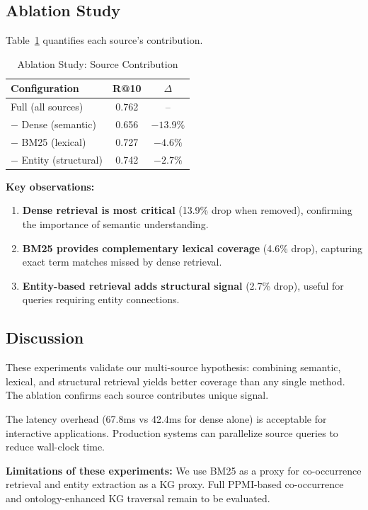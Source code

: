 \documentclass[11pt,a4paper]{article}
\begin{document}
\subsection{Ablation Study}

Table~\ref{tab:ablation} quantifies each source's contribution.

\begin{table}[h]
\centering
\caption{Ablation Study: Source Contribution}
\label{tab:ablation}
\begin{tabular}{lcc}
\toprule
\textbf{Configuration} & \textbf{R@10} & \textbf{$\Delta$} \\
\midrule
Full (all sources) & 0.762 & -- \\
$-$ Dense (semantic) & 0.656 & $-13.9\%$ \\
$-$ BM25 (lexical) & 0.727 & $-4.6\%$ \\
$-$ Entity (structural) & 0.742 & $-2.7\%$ \\
\bottomrule
\end{tabular}
\end{table}

\textbf{Key observations:}
\begin{enumerate}
    \item \textbf{Dense retrieval is most critical} (13.9\% drop when removed), confirming the importance of semantic understanding.
    \item \textbf{BM25 provides complementary lexical coverage} (4.6\% drop), capturing exact term matches missed by dense retrieval.
    \item \textbf{Entity-based retrieval adds structural signal} (2.7\% drop), useful for queries requiring entity connections.
\end{enumerate}

\subsection{Discussion}

These experiments validate our multi-source hypothesis: combining semantic, lexical, and structural retrieval yields better coverage than any single method. The ablation confirms each source contributes unique signal.

The latency overhead (67.8ms vs 42.4ms for dense alone) is acceptable for interactive applications. Production systems can parallelize source queries to reduce wall-clock time.

\textbf{Limitations of these experiments:} We use BM25 as a proxy for co-occurrence retrieval and entity extraction as a KG proxy. Full PPMI-based co-occurrence and ontology-enhanced KG traversal remain to be evaluated.
\end{document}
